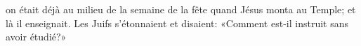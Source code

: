 \encetemps
	on était déjà au milieu de la semaine de la fête quand Jésus monta au Temple;
	et là il enseignait.
Les Juifs s’étonnaient et disaient:
	«Comment est-il instruit sans avoir étudié?»
